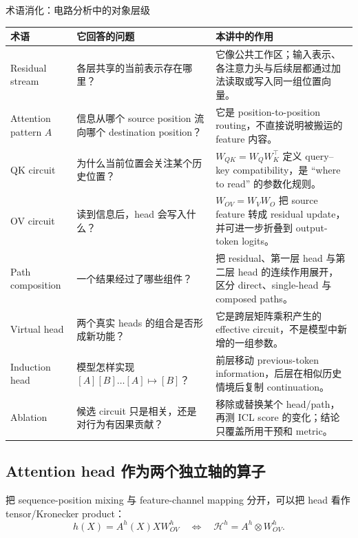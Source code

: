 \begin{knowledgebox}{术语消化：电路分析中的对象层级}
\small
\begin{tabularx}{\textwidth}{L{0.22\textwidth}L{0.28\textwidth}X}
\toprule
术语 & 它回答的问题 & 本讲中的作用 \\
\midrule
Residual stream & 各层共享的当前表示存在哪里？ & 它像公共工作区；输入表示、各注意力头与后续层都通过加法读取或写入同一组位置向量。 \\
Attention pattern $A$ & 信息从哪个 source position 流向哪个 destination position？ & 它是 position-to-position routing，不直接说明被搬运的 feature 内容。 \\
QK circuit & 为什么当前位置会关注某个历史位置？ & $W_{QK}=W_QW_K^{\top}$ 定义 query--key compatibility，是 ``where to read'' 的参数化规则。 \\
OV circuit & 读到信息后，head 会写入什么？ & $W_{OV}=W_VW_O$ 把 source feature 转成 residual update，并可进一步折叠到 output-token logits。 \\
Path composition & 一个结果经过了哪些组件？ & 把 residual、第一层 head 与第二层 head 的连续作用展开，区分 direct、single-head 与 composed paths。 \\
Virtual head & 两个真实 heads 的组合是否形成新功能？ & 它是跨层矩阵乘积产生的 effective circuit，不是模型中新增的一组参数。 \\
Induction head & 模型怎样实现 $[A][B]\ldots[A]\mapsto[B]$？ & 前层移动 previous-token information，后层在相似历史情境后复制 continuation。 \\
Ablation & 候选 circuit 只是相关，还是对行为有因果贡献？ & 移除或替换某个 head/path，再测 ICL score 的变化；结论只覆盖所用干预和 metric。 \\
\bottomrule
\end{tabularx}
\end{knowledgebox}



\subsection{Attention head 作为两个独立轴的算子}

把 sequence-position mixing 与 feature-channel mapping 分开，可以把 head 看作 tensor/Kronecker product：
\[
h(X)=A^h(X)XW_{OV}^h
\quad\Longleftrightarrow\quad
\mathcal{H}^h=A^h\otimes W_{OV}^h.
\]

